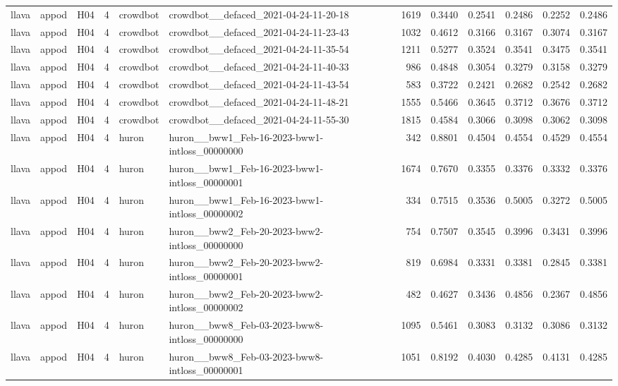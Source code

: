 \begin{table}[tbp]
\begin{tabular}{lllrllrrrrrr}
llava & appod & H04 & 4 & crowdbot & crowdbot\_\_defaced\_2021-04-24-11-20-18 & 1619 & 0.3440 & 0.2541 & 0.2486 & 0.2252 & 0.2486 \\
llava & appod & H04 & 4 & crowdbot & crowdbot\_\_defaced\_2021-04-24-11-23-43 & 1032 & 0.4612 & 0.3166 & 0.3167 & 0.3074 & 0.3167 \\
llava & appod & H04 & 4 & crowdbot & crowdbot\_\_defaced\_2021-04-24-11-35-54 & 1211 & 0.5277 & 0.3524 & 0.3541 & 0.3475 & 0.3541 \\
llava & appod & H04 & 4 & crowdbot & crowdbot\_\_defaced\_2021-04-24-11-40-33 & 986 & 0.4848 & 0.3054 & 0.3279 & 0.3158 & 0.3279 \\
llava & appod & H04 & 4 & crowdbot & crowdbot\_\_defaced\_2021-04-24-11-43-54 & 583 & 0.3722 & 0.2421 & 0.2682 & 0.2542 & 0.2682 \\
llava & appod & H04 & 4 & crowdbot & crowdbot\_\_defaced\_2021-04-24-11-48-21 & 1555 & 0.5466 & 0.3645 & 0.3712 & 0.3676 & 0.3712 \\
llava & appod & H04 & 4 & crowdbot & crowdbot\_\_defaced\_2021-04-24-11-55-30 & 1815 & 0.4584 & 0.3066 & 0.3098 & 0.3062 & 0.3098 \\
llava & appod & H04 & 4 & huron & huron\_\_bww1\_Feb-16-2023-bww1-intloss\_00000000 & 342 & 0.8801 & 0.4504 & 0.4554 & 0.4529 & 0.4554 \\
llava & appod & H04 & 4 & huron & huron\_\_bww1\_Feb-16-2023-bww1-intloss\_00000001 & 1674 & 0.7670 & 0.3355 & 0.3376 & 0.3332 & 0.3376 \\
llava & appod & H04 & 4 & huron & huron\_\_bww1\_Feb-16-2023-bww1-intloss\_00000002 & 334 & 0.7515 & 0.3536 & 0.5005 & 0.3272 & 0.5005 \\
llava & appod & H04 & 4 & huron & huron\_\_bww2\_Feb-20-2023-bww2-intloss\_00000000 & 754 & 0.7507 & 0.3545 & 0.3996 & 0.3431 & 0.3996 \\
llava & appod & H04 & 4 & huron & huron\_\_bww2\_Feb-20-2023-bww2-intloss\_00000001 & 819 & 0.6984 & 0.3331 & 0.3381 & 0.2845 & 0.3381 \\
llava & appod & H04 & 4 & huron & huron\_\_bww2\_Feb-20-2023-bww2-intloss\_00000002 & 482 & 0.4627 & 0.3436 & 0.4856 & 0.2367 & 0.4856 \\
llava & appod & H04 & 4 & huron & huron\_\_bww8\_Feb-03-2023-bww8-intloss\_00000000 & 1095 & 0.5461 & 0.3083 & 0.3132 & 0.3086 & 0.3132 \\
llava & appod & H04 & 4 & huron & huron\_\_bww8\_Feb-03-2023-bww8-intloss\_00000001 & 1051 & 0.8192 & 0.4030 & 0.4285 & 0.4131 & 0.4285 \\

\end{tabular}
\end{table}
